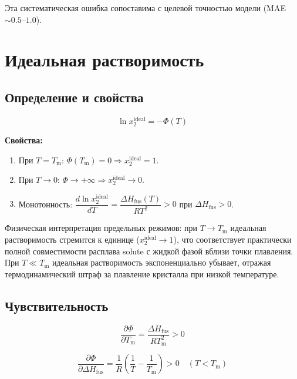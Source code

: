 \documentclass[11pt]{article}
\begin{document}
Эта систематическая ошибка сопоставима с целевой точностью модели (MAE $\sim 0.5$--$1.0$).

\section{Идеальная растворимость}

\subsection{Определение и свойства}

\begin{equation*}
\ln x_2^{\mathrm{ideal}} = -\Phi(T)
\end{equation*}

\textbf{Свойства:}

\begin{enumerate}
  \item При $T = T_{\mathrm{m}}$: $\Phi(T_{\mathrm{m}}) = 0 \Rightarrow x_2^{\mathrm{ideal}} = 1$.
  \item При $T \to 0$: $\Phi \to +\infty \Rightarrow x_2^{\mathrm{ideal}} \to 0$.
  \item Монотонность: $\dfrac{d\ln x_2^{\mathrm{ideal}}}{dT} = \dfrac{\Delta H_{\mathrm{fus}}(T)}{RT^2} > 0$ при $\Delta H_{\mathrm{fus}} > 0$.
\end{enumerate}

Физическая интерпретация предельных режимов: при $T\to T_{\mathrm{m}}$ идеальная растворимость стремится к единице ($x_2^{\mathrm{ideal}}\to 1$), что соответствует практически полной совместимости расплава solute с жидкой фазой вблизи точки плавления. При $T\ll T_{\mathrm{m}}$ идеальная растворимость экспоненциально убывает, отражая термодинамический штраф за плавление кристалла при низкой температуре.

\subsection{Чувствительность}

\begin{equation*}
\frac{\partial \Phi}{\partial T_{\mathrm{m}}} = \frac{\Delta H_{\mathrm{fus}}}{RT_{\mathrm{m}}^2} > 0
\end{equation*}

\begin{equation*}
\frac{\partial \Phi}{\partial \Delta H_{\mathrm{fus}}} = \frac{1}{R}\!\left(\frac{1}{T} - \frac{1}{T_{\mathrm{m}}}\right) > 0 \quad (T < T_{\mathrm{m}})
\end{equation*}
\end{document}
